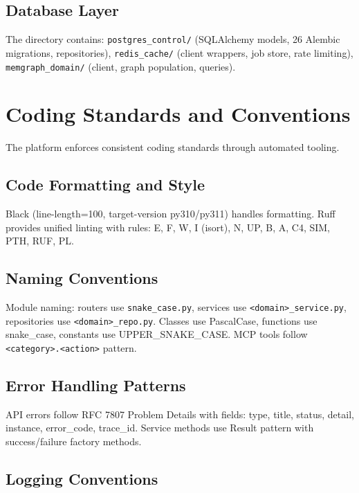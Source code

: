 \documentclass[a4paper,twoside]{sapthesis}
\begin{document}
\subsection{Database Layer}

The  directory contains: \texttt{postgres\_control/} (SQLAlchemy models, 26 Alembic migrations, repositories), \texttt{redis\_cache/} (client wrappers, job store, rate limiting), \texttt{memgraph\_domain/} (client, graph population, queries).

\section{Coding Standards and Conventions}
\label{sec:coding-standards}

The platform enforces consistent coding standards through automated tooling.

\subsection{Code Formatting and Style}

Black (line-length=100, target-version py310/py311) handles formatting. Ruff provides unified linting with rules: E, F, W, I (isort), N, UP, B, A, C4, SIM, PTH, RUF, PL.

\subsection{Naming Conventions}

Module naming: routers use \texttt{snake\_case.py}, services use \texttt{<domain>\_service.py}, repositories use \texttt{<domain>\_repo.py}. Classes use PascalCase, functions use snake\_case, constants use UPPER\_SNAKE\_CASE. MCP tools follow \texttt{<category>.<action>} pattern.

\subsection{Error Handling Patterns}

API errors follow RFC 7807 Problem Details with fields: type, title, status, detail, instance, error\_code, trace\_id. Service methods use Result pattern with success/failure factory methods.

\subsection{Logging Conventions}
\end{document}
